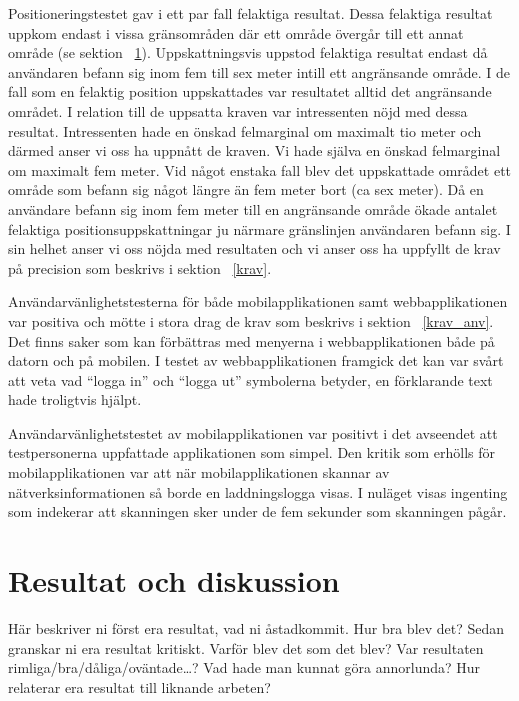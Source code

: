 \documentclass[a4paper,12pt]{article}
\begin{document}
 Positioneringstestet gav i ett par fall felaktiga resultat. Dessa felaktiga resultat uppkom endast i vissa gränsområden där ett område övergår till ett annat område (se sektion ~\ref{resultat}). Uppskattningsvis uppstod felaktiga resultat endast då användaren befann sig inom fem till sex meter intill ett angränsande område. I de fall som en felaktig position uppskattades var resultatet alltid det angränsande området. I relation till de uppsatta kraven var intressenten nöjd med dessa resultat. Intressenten hade en önskad felmarginal om maximalt tio meter och därmed anser vi oss ha uppnått de kraven. Vi hade själva en önskad felmarginal om maximalt fem meter. Vid något enstaka fall blev det uppskattade området ett område som befann sig något längre än fem meter bort (ca sex meter). Då en användare befann sig inom fem meter till en angränsande område ökade antalet felaktiga positionsuppskattningar ju närmare gränslinjen användaren befann sig. I sin helhet anser vi oss nöjda med resultaten och vi anser oss ha uppfyllt de krav på precision som beskrivs i sektion ~\ref{krav}.

 Användarvänlighetstesterna för både mobilapplikationen samt webbapplikationen var positiva och mötte i stora drag de krav som beskrivs i sektion ~\ref{krav_anv}. Det finns saker som kan förbättras med menyerna i webbapplikationen både på datorn och på mobilen. I testet av webbapplikationen framgick det kan var svårt att veta vad ``logga in'' och ``logga ut'' symbolerna betyder, en förklarande text hade troligtvis hjälpt.

 Användarvänlighetstestet av mobilapplikationen var positivt i det avseendet att testpersonerna uppfattade applikationen som simpel. Den kritik som erhölls för mobilapplikationen var att när mobilapplikationen skannar av nätverksinformationen så borde en laddningslogga visas. I nuläget visas ingenting som indekerar att skanningen sker under de fem sekunder som skanningen pågår.


 \section{Resultat och diskussion}\label{resultat}
 \iffalse Här beskriver ni först era resultat, vad ni åstadkommit.  Hur bra blev det?
 Sedan granskar ni era resultat kritiskt.  Varför blev det som det blev?  Var resultaten rimliga/bra/dåliga/o\-vän\-ta\-de\ldots?
 Vad hade man kunnat göra annorlunda?  Hur relaterar era resultat till liknande arbeten?
\end{document}
